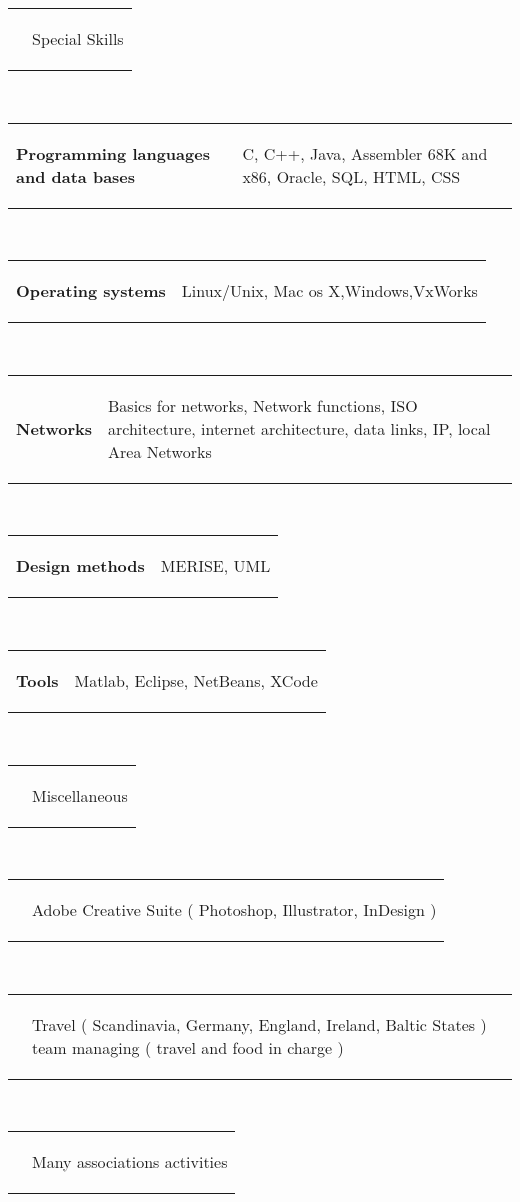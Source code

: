 \documentclass[a4paper,11.5pt]{article}
\makeatletter
\newlength{\topMarginSection}
\newlength{\bottomMarginSection}
\newlength{\tabularVSpace}
\newcommand{\mycolor}[1]{
	\textcolor[RGB]{59,134,254}{#1}
}
\newcommand{\rmp}[1]{
	\begin{minipage}[t]{5cm}
		\begin{flushright}
			#1
		\end{flushright}
	\end{minipage}	
}
\newcommand{\lmp}[1]{
	\begin{minipage}[t]{13cm}
		\begin{flushleft}
			#1
		\end{flushleft}
	\end{minipage}
}
\newcommand{\rltab}[2]{
	\begin{tabular}{ p{5cm} @{\hspace{2\tabularVSpace}} p{16cm} }
	\rmp{#1} & \lmp{#2}
	\end{tabular}
}
\newcommand{\paragraphTitle}[1]{
		\huge{\mycolor{#1}}
}
\renewcommand{\section}[1]{
	\vspace{\topMarginSection}
	\rltab{}{\paragraphTitle{#1}}
	\vspace{\bottomMarginSection}\\
}
\renewcommand{\subsection}[2]{
	\rltab{\textbf{#1}}{#2}\\
}
\makeatother
\begin{document}
\section{Special Skills}
\subsection{Programming languages and data bases}
			{C, C++, Java, Assembler 68K and x86, Oracle, SQL, HTML, CSS}
	
\subsection{Operating systems}
			{Linux/Unix, Mac os X,Windows,VxWorks}
	
\subsection{Networks}
			{Basics for networks, Network functions, ISO architecture, internet architecture, data links, IP, local Area Networks}
	
\subsection{Design methods}
			{MERISE, UML}
	
\subsection{Tools}
			{Matlab, Eclipse, NetBeans, XCode}
			
\section{Miscellaneous}
\subsection{}{Adobe Creative Suite ( Photoshop, Illustrator, InDesign )}
	
\subsection{}{Travel ( Scandinavia, Germany, England, Ireland, Baltic States ) team managing ( travel and food in charge )}
	
\subsection{}{Many associations activities}
\end{document}

